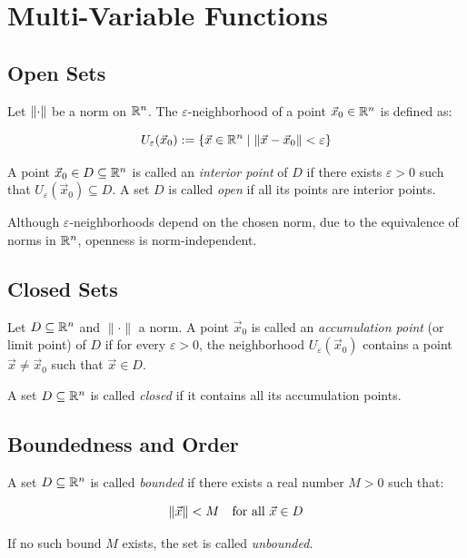 \chapter{Multi-Variable Functions}

\section{Open Sets}

Let \( \left\| \cdot \right\| \) be a norm on \( \mathbb{R}^n \). The \( \varepsilon \)-neighborhood of a 
point \( \vec{x}_0 \in \mathbb{R}^n \) is defined as:

\[
    U_\varepsilon(\vec{x}_0) := \left\{ \vec{x} \in \mathbb{R}^n \mid \left\| \vec{x} - \vec{x}_0 \right\| 
    < \varepsilon \right\}
\]

A point \( \vec{x}_0 \in D \subseteq \mathbb{R}^n \) is called an \emph{interior point} of \( D \) 
if there exists \( \varepsilon > 0 \) such that \( U_\varepsilon(\vec{x}_0) \subseteq D \).  
A set \( D \) is called \emph{open} if all its points are interior points.

Although \( \varepsilon \)-neighborhoods depend on the chosen norm, due to the equivalence of norms 
in \( \mathbb{R}^n \), openness is norm-independent.

\section{Closed Sets}

Let \( D \subseteq \mathbb{R}^n \) and \( \| \cdot \| \) a norm. A point \( \vec{x}_0 \) is called 
an \emph{accumulation point} (or limit point) of \( D \) if for every \( \varepsilon > 0 \), the 
neighborhood \( U_\varepsilon(\vec{x}_0) \) contains a point \( \vec{x} \ne \vec{x}_0 \) such that 
\( \vec{x} \in D \).

A set \( D \subseteq \mathbb{R}^n \) is called \emph{closed} if it contains all its accumulation points.

\section{Boundedness and Order}

A set \( D \subseteq \mathbb{R}^n \) is called \emph{bounded} if there exists a real number \( M > 0 \) 
such that:

\[
    \left\| \vec{x} \right\| < M \quad \text{for all } \vec{x} \in D
\]

If no such bound \( M \) exists, the set is called \emph{unbounded}.

